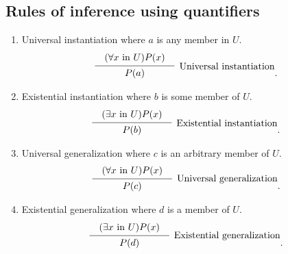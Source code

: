 \documentclass[a4paper,english,12pt]{article}
\begin{document}
\subsection{Rules of inference using quantifiers}
\begin{enumerate}
	\item Universal instantiation where $a$ is any member in $U$.
		\begin{equation*}
		\infer[\text{Universal instantiation}]{\begin{array}{@{}llr@{}llr@{}llr@{}}&P(a)& \end{array}}{\begin{array}{@{}llr@{}llr@{}llr@{}} &(\forall x \text{ in } U) P(x)&\end{array}}.
		\end{equation*}
	\item Existential instantiation where $b$ is some	member of $U$.
	\begin{equation*}
		\infer[\text{Existential instantiation}]{\begin{array}{@{}llr@{}llr@{}llr@{}}&P(b)& \end{array}}{\begin{array}{@{}llr@{}llr@{}llr@{}} &(\exists x \text{ in } U) P(x)&\end{array}}.
		\end{equation*}
	\item Universal generalization where $c$ is an arbitrary member of $U$.
	\begin{equation*}
		\infer[\text{Universal generalization}]{\begin{array}{@{}llr@{}llr@{}llr@{}}&P(c)&\end{array}}{\begin{array}{@{}llr@{}llr@{}llr@{}} &(\forall x \text{ in } U) P(x)&\end{array}}.
		\end{equation*}
			\item Existential generalization where $d$ is a member of $U$.
	\begin{equation*}
		\infer[\text{Existential generalization}]{\begin{array}{@{}llr@{}llr@{}llr@{}}&P(d)&\end{array}}{\begin{array}{@{}llr@{}llr@{}llr@{}} &(\exists x \text{ in } U) P(x)&\end{array}}.
		\end{equation*}
\end{enumerate}
\end{document}
